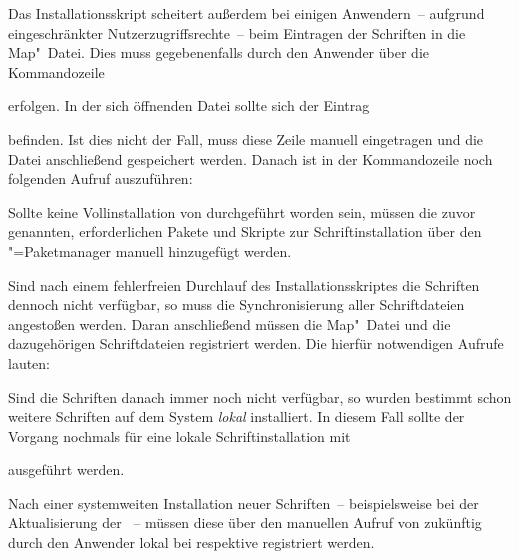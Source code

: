 Das Installationsskript scheitert außerdem bei einigen Anwendern~-- aufgrund 
eingeschränkter Nutzerzugriffsrechte~-- beim Eintragen der Schriften in die 
Map"~Datei. Dies muss gegebenenfalls durch den Anwender über die Kommandozeile 
%
\begin{quoting}
\end{quoting}
%
erfolgen. In der sich öffnenden Datei sollte sich der Eintrag 
%
\begin{quoting}
\end{quoting}
%
befinden. Ist dies nicht der Fall, muss diese Zeile manuell eingetragen und die 
Datei anschließend gespeichert werden. Danach ist in der Kommandozeile noch 
folgenden Aufruf auszuführen:
%
\begin{quoting}
\end{quoting}


%
Sollte keine Vollinstallation von \TeXLive durchgeführt worden sein, müssen die 
zuvor genannten, erforderlichen Pakete und Skripte zur Schriftinstallation über 
den \TeXLive"=Paketmanager manuell hinzugefügt werden.

Sind nach einem fehlerfreien Durchlauf des Installationsskriptes die Schriften 
dennoch nicht verfügbar, so muss die Synchronisierung aller Schriftdateien 
angestoßen werden. Daran anschließend müssen die Map"~Datei und die 
dazugehörigen Schriftdateien registriert werden. Die hierfür notwendigen 
Aufrufe lauten:
%
\begin{quoting}
\newline
{}\newline
{}
\end{quoting}
%
Sind die Schriften danach immer noch nicht verfügbar, so wurden bestimmt schon 
weitere Schriften auf dem System \emph{lokal} installiert. In diesem Fall 
sollte der Vorgang nochmals für eine lokale Schriftinstallation mit 
%
\begin{quoting}
\newline
{}\newline
{}
\end{quoting}
%
ausgeführt werden. 

Nach einer systemweiten Installation neuer Schriften~-- beispielsweise bei der 
Aktualisierung der \DistributionGeneral~-- müssen diese über den manuellen 
Aufruf von  zukünftig durch den Anwender lokal bei 
\TeXLive respektive \MacTeX registriert werden.



